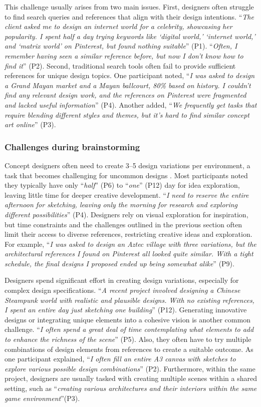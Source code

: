 This challenge usually arises from two main issues. First, designers often struggle to find search queries and references that align with their design intentions. “\textit{The client asked me to design an internet world for a celebrity, showcasing her popularity. I spent half a day trying keywords like ‘digital world,’ ‘internet world,’ and ‘matrix world’ on Pinterest, but found nothing suitable}” (P1). “\textit{Often, I remember having seen a similar reference before, but now I don't know how to find it}” (P2). Second, traditional search tools often fail to provide sufficient references for unique design topics. One participant noted, “\textit{I was asked to design a Grand Mayan market and a Mayan ballcourt, 80\% based on history. I couldn’t find any relevant design work, and the references on Pinterest were fragmented and lacked useful information}” (P4). Another added, “\textit{We frequently get tasks that require blending different styles and themes, but it's hard to find similar concept art online}” (P3).

\subsubsection{Challenges during brainstorming}
Concept designers often need to create 3–5 design variations per environment, a task that becomes challenging for uncommon designs \cite{bigbadWorld2015}. Most participants noted they typically have only “\textit{half}” (P6)  to “\textit{one}” (P12) day for idea exploration, leaving little time for deeper creative development. “\textit{I need to reserve the entire afternoon for sketching, leaving only the morning for research and exploring different possibilities}” (P4). Designers rely on visual exploration for inspiration, but time constraints and the challenges outlined in the previous section often limit their access to diverse references, restricting creative ideas and exploration. For example, “\textit{I was asked to design an Aztec village with three variations, but the architectural references I found on Pinterest all looked quite similar. With a tight schedule, the final designs I proposed ended up being somewhat alike}” (P9).

Designers spend significant effort in creating design variations, especially for complex design specifications. “\textit{A recent project involved designing a Chinese Steampunk world with realistic and plausible designs. With no existing references, I spent an entire day just sketching one building}” (P12). Generating innovative designs or integrating unique elements into a cohesive vision is another common challenge. “\textit{I often spend a great deal of time contemplating what elements to add to enhance the richness of the scene}” (P5). Also, they often have to try multiple combinations of design elements from references to create a suitable outcome. As one participant explained, “\textit{I often fill an entire A3 canvas with sketches to explore various possible design combinations}” (P2). Furthermore, within the same project, designers are usually tasked with creating multiple scenes within a shared setting, such as “\textit{creating various architectures and their interiors within the same game environment}”(P3). 


